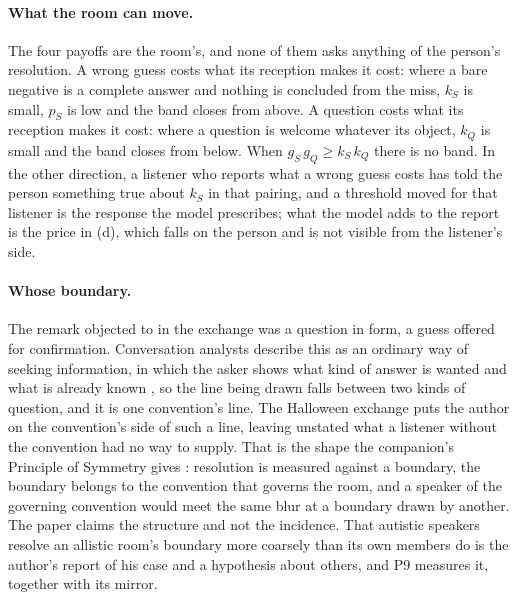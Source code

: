 \paragraph{What the room can move.} The four payoffs are the room's, and none of them asks anything of the person's resolution. A wrong guess costs what its reception makes it cost: where a bare negative is a complete answer and nothing is concluded from the miss, $k_S$ is small, $p_S$ is low and the band closes from above. A question costs what its reception makes it cost: where a question is welcome whatever its object, $k_Q$ is small and the band closes from below. When $g_S\,g_Q \ge k_S\,k_Q$ there is no band. In the other direction, a listener who reports what a wrong guess costs has told the person something true about $k_S$ in that pairing, and a threshold moved for that listener is the response the model prescribes; what the model adds to the report is the price in (d), which falls on the person and is not visible from the listener's side.

\paragraph{Whose boundary.} The remark objected to in the exchange was a question in form, a guess offered for confirmation. Conversation analysts describe this as an ordinary way of seeking information, in which the asker shows what kind of answer is wanted and what is already known \cite{Pomerantz1988}, so the line being drawn falls between two kinds of question, and it is one convention's line. The Halloween exchange puts the author on the convention's side of such a line, leaving unstated what a listener without the convention had no way to supply. That is the shape the companion's Principle of Symmetry gives \cite{NormCost}: resolution is measured against a boundary, the boundary belongs to the convention that governs the room, and a speaker of the governing convention would meet the same blur at a boundary drawn by another. The paper claims the structure and not the incidence. That autistic speakers resolve an allistic room's boundary more coarsely than its own members do is the author's report of his case and a hypothesis about others, and P9 measures it, together with its mirror.

